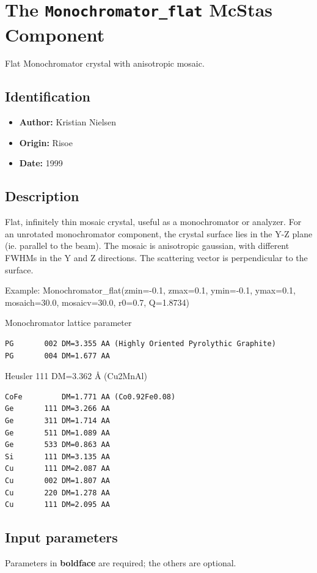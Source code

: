 \section{The \texttt{Monochromator\_flat} McStas Component}
Flat Monochromator crystal with anisotropic mosaic.

\subsection*{Identification}
\begin{itemize}
  \item \textbf{Author:} Kristian Nielsen
  \item \textbf{Origin:} Risoe
  \item \textbf{Date:} 1999
\end{itemize}

\subsection*{Description}
Flat, infinitely thin mosaic crystal, useful as a monochromator or analyzer. For an unrotated monochromator component, the crystal surface lies in the Y-Z plane (ie. parallel to the beam). The mosaic is anisotropic gaussian, with different FWHMs in the Y and Z directions. The scattering vector is perpendicular to the surface.

Example: Monochromator\_flat(zmin=-0.1, zmax=0.1, ymin=-0.1, ymax=0.1, mosaich=30.0, mosaicv=30.0, r0=0.7, Q=1.8734)

Monochromator lattice parameter

\begin{verbatim}
PG       002 DM=3.355 AA (Highly Oriented Pyrolythic Graphite)
PG       004 DM=1.677 AA
\end{verbatim}

Heusler 111 DM=3.362 \AA{} (Cu2MnAl)

\begin{verbatim}
CoFe         DM=1.771 AA (Co0.92Fe0.08)
Ge       111 DM=3.266 AA
Ge       311 DM=1.714 AA
Ge       511 DM=1.089 AA
Ge       533 DM=0.863 AA
Si       111 DM=3.135 AA
Cu       111 DM=2.087 AA
Cu       002 DM=1.807 AA
Cu       220 DM=1.278 AA
Cu       111 DM=2.095 AA
\end{verbatim}

\subsection*{Input parameters}
Parameters in \textbf{boldface} are required; the others are optional.

